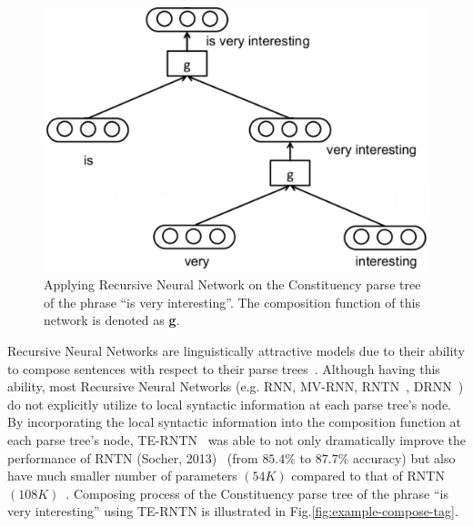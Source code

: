 \begin{figure}[H]
    \centering
    \includegraphics[scale=0.46]{figure/example-compose}
    \caption[Applying Recursive Neural Network on the phrase ``is very interesting'']{Applying Recursive Neural Network on the Constituency parse tree of the phrase ``is very interesting''.
    The composition function of this network is denoted as \textbf{g}.}
    \label{fig:example-compose}
\end{figure}

Recursive Neural Networks are linguistically attractive models due to their ability to compose sentences with respect to their parse trees~\cite{treeLSTM}.
Although having this ability, most Recursive Neural Networks (e.g. RNN, MV-RNN, RNTN~\cite{socher2013recursive}, DRNN~\cite{IrsoyDRNN}) do not explicitly utilize to local syntactic information at each parse tree's node.
By incorporating the local syntactic information into the composition function at each parse tree's node, TE-RNTN~\cite{tag-embedding-rnn} was able to not only dramatically improve the performance of RNTN (Socher, 2013)~\cite{socher2013recursive} (from \(85.4\%\) to \(87.7\%\) accuracy) but also have much smaller number of parameters \((54K)\) compared to that of RNTN \((108K)\)~\cite{tag-embedding-rnn}.
Composing process of the Constituency parse tree of the phrase ``is very interesting'' using TE-RNTN is illustrated in Fig.\ref{fig:example-compose-tag}.


